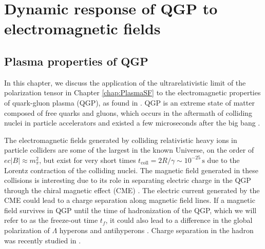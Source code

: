 \section{Dynamic response of QGP to electromagnetic fields}\label{chap:QCD}
\subsection{Plasma properties of QGP}

In this chapter, we discuss the application of the ultrarelativistic limit of the polarization tensor in Chapter \ref{chap:PlasmaSF} to the electromagnetic properties of quark-gluon plasma (QGP), as found in \cite{Grayson:2022asf}. QGP is an extreme state of matter composed of free quarks and gluons, which occurs in the aftermath of colliding nuclei in particle accelerators and existed a few microseconds after the big bang \cite{Letessier:2002ony}. 

The electromagnetic fields generated by colliding relativistic heavy ions in particle colliders are some of the largest in the known Universe, on the order of $ec|B| \approx m_\pi^2$, but exist for very short times $t_{\text{coll}}= 2 R/\gamma \sim 10^{-25}\,\textrm{s}$ due to the Lorentz contraction of the colliding nuclei. The magnetic field generated in these collisions is interesting due to its role in separating electric charge in the QGP through the chiral magnetic effect (CME) \cite{Kharzeev:2007jp}. The electric current generated by the CME could lead to a charge separation along magnetic field lines. If a magnetic field survives in QGP until the time of hadronization of the QGP, which we will refer to as the freeze-out time $t_f$, it could also lead to a difference in the global polarization of $\Lambda$ hyperons and antihyperons \cite{Muller:2018ibh}. Charge separation in the hadron was recently studied in \cite{STAR:2023jdd}. 

